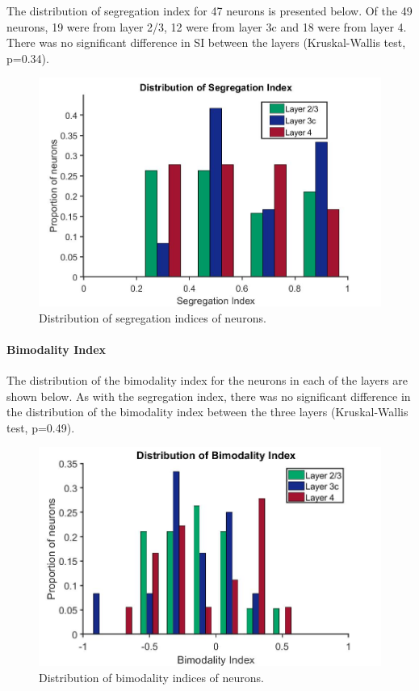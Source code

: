 	The distribution of segregation index for 47 neurons is presented below. Of the 49 neurons, 19 were from layer 2/3, 12 were from layer 3c and 18 were from layer 4. There was no significant difference in SI between the layers (Kruskal-Wallis test, p=0.34).
	\begin{figure}[H]
		
		\includegraphics[width=\linewidth]{LinearV1/segregationindex_colouradj.jpg}
		\caption{Distribution of segregation indices of neurons.}
		\label{fig:fig3}
	\end{figure}

	\paragraph{Bimodality Index}
	
	The distribution of the bimodality index for the neurons in each of the layers are shown below. As with the segregation index, there was no significant difference in the distribution of the bimodality index between the three layers (Kruskal-Wallis test, p=0.49).
	
	\begin{figure}[H]
		
		\includegraphics[width=\linewidth]{LinearV1/Biindex.jpg}
		\caption{Distribution of bimodality indices of neurons.}
		\label{fig:bi}
	\end{figure}

